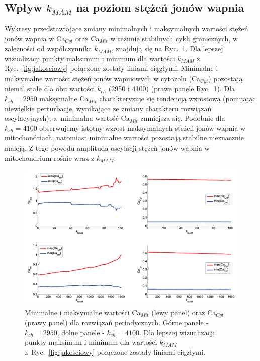 \FloatBarrier
\subsection{Wpływ $k_{MAM}$ na poziom stężeń jonów wapnia}

Wykresy przedstawiające zmiany minimalnych i maksymalnych wartości stężeń jonów wapnia w Ca$_{Cyt}$ oraz Ca$_{Mit}$ w reżimie stabilnych cykli granicznych, w zależności od współczynnika $k_{MAM}$, znajdują się na Ryc.~\ref{fig:minmaxMo1}. Dla lepszej wizualizacji punkty maksimum i minimum dla wartości $k_{MAM}$ z Ryc.~\ref{fig:jakosciowy} połączone zostały liniami ciągłymi. Minimalne i maksymalne wartości stężeń jonów wapniowych w cytozolu (Ca$_{Cyt}$) pozostają niemal stałe dla obu wartości $k_{ch}$ (2950 i 4100) (prawe panele Ryc.~\ref{fig:minmaxMo1}). Dla $k_{ch} = 2950$ maksymalne Ca$_{Mit}$ charakteryzuje się tendencją wzrostową (pomijając niewielkie perturbacje, wynikające ze zmiany charakteru rozwiązań oscylacyjnych), a~minimalna wartość Ca$_{Mit}$ zmniejsza się. Podobnie dla $k_{ch} = 4100$ obserwujemy istotny wzrost maksymalnych stężeń jonów wapnia w mitochondriach, natomiast minimalne wartości pozostają stabilne nieznacznie maleją. Z tego powodu amplituda oscylacji stężeń jonów wapnia w mitochondrium rośnie wraz z $k_{MAM}$.


\begin{figure}[!ht]
	\centering
	\includegraphics[width=1\textwidth]{rysunki/rozdzial_5/minmaxMo1}
	\caption[Minimalne i maksymalne wartości Ca$_{Mit}$ i Ca$_{Cyt}$]{Minimalne i maksymalne wartości Ca$_{Mit}$ (lewy panel) oraz Ca$_{Cyt}$ (prawy panel) dla rozwiązań periodycznych. Górne panele -  $k_{ch}=2950$, dolne panele - $k_{ch}=4100$. Dla lepszej wizualizacji punkty maksimum i minimum dla wartości $k_{MAM}$ z~Ryc.~\ref{fig:jakosciowy} połączone zostały liniami ciągłymi.}
	\label{fig:minmaxMo1}
\end{figure}




